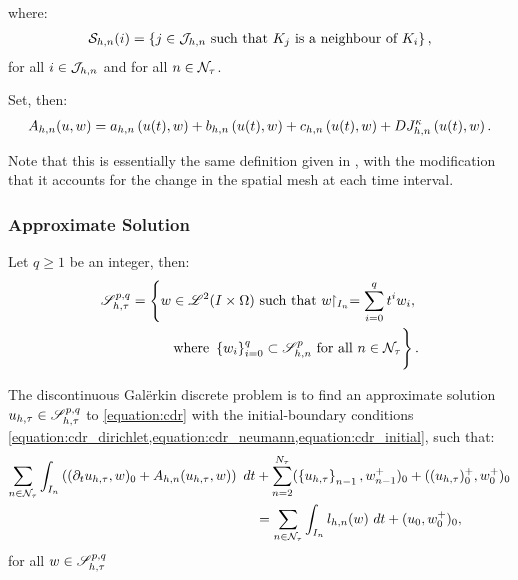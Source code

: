 \newpage
where:
\begin{align}
    \mathcal{S}_{h, n}(i) = \left\{ j \in \mathcal{J}_{h, n} \text{ such that } K_j \text{ is a neighbour of } K_i \right\},
\end{align}
for all $i \in \mathcal{J}_{h, n}$ and for all $n \in \mathcal{N}_{\tau}$.

Set, then:
\begin{align}
    A_{h, n}(u, w) = a_{h, n} \left( u(t), w \right) + b_{h, n} \left( u(t), w \right) + c_{h, n} \left( u(t), w \right) + D J^{\kappa}_{h, n} \left( u(t), w \right) \label{equation:cdr_Ahn}.
\end{align}

Note that this is essentially the same definition given in , with the modification that it accounts for the change in the spatial mesh at each time interval.

\newpage
\subsubsection{Approximate Solution}

\begin{definition}[$\SpaceSolutionFull$]
    Let $q \geq 1$ be an integer, then:
    \begin{align} %
        \SpaceSolutionFull = \left\{ w \in \SpaceLp{2}(I \times \Omega) \text{ such that } w \Restriction_{I_n} = \sum_{i = 0}^q t^i w_i, \right. \\ 
        \left. \vphantom{\sum_{i = 0}^q} \text{ where } \left\{ w_i \right\}_{i = 0}^q \subset \SpaceSolution_{h, n}^p \text{ for all } n \in \TimeIndices \right\}.
    \end{align}
\end{definition}

The discontinuous Galërkin discrete problem is to find an approximate solution $u_{h, \tau} \in \mathscr{S}^{p, q}_{h, \tau}$ to \cref{equation:cdr} with the initial-boundary conditions \cref{equation:cdr_dirichlet,equation:cdr_neumann,equation:cdr_initial}, such that:
\begin{align} %
    \sum_{n \in \TimeIndices} \int_{I_n} \left( (\partial_t u_{h, \tau}, w )_0 + A_{h, n}(u_{h, \tau}, w) \right) ~ dt \notag &+ \sum_{n = 2}^{\nTimeIndices} (\left\{ u_{h, \tau} \right\}_{n - 1}, w_{n - 1}^+ )_0 + ((u_{h, \tau})_0^+, w_0^+ )_0 \notag \\
    &= \sum_{n \in \TimeIndices} \int_{I_n} l_{h, n}(w) ~ dt + (u_0, w_0^+ )_0, \label{equation:cdr_discrete}
\end{align}
for all $w \in \mathscr{S}^{p, q}_{h, \tau}$

